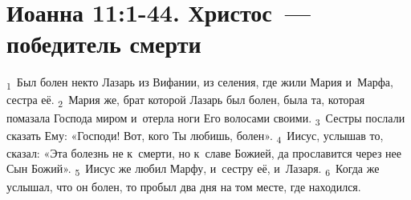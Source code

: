 \documentclass[a4paper,12pt]{article}
\begin{document}
\section{Иоанна 11:1-44. Христос~--- победитель смерти}


\textsubscript{1}~Был болен некто Лазарь из Вифании, из селения, где жили Мария и~Марфа, сестра её.
\textsubscript{2}~Мария же, брат которой Лазарь был болен, была та, которая помазала Господа миром и~отерла ноги Его волосами своими.
\textsubscript{3}~Сестры послали сказать Ему: «Господи! Вот, кого Ты любишь, болен».
\textsubscript{4}~Иисус, услышав то, сказал: «Эта болезнь не к~смерти, но к~славе Божией, да прославится через нее Сын Божий».
\textsubscript{5}~Иисус же любил Марфу, и~сестру её, и~Лазаря.
\textsubscript{6}~Когда же услышал, что он болен, то пробыл два дня на том месте, где находился.
\end{document}
